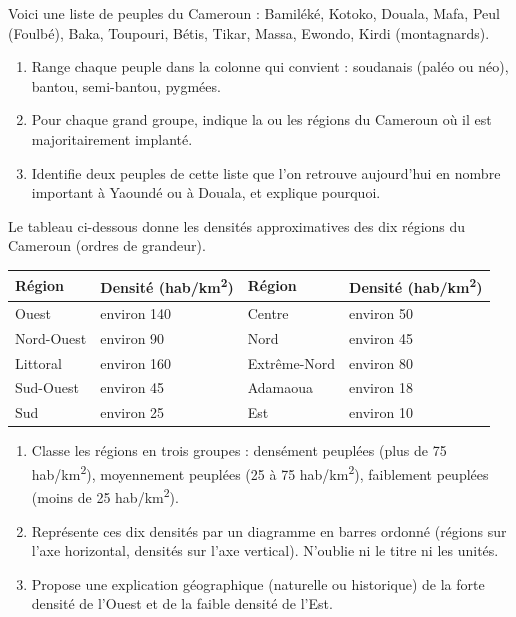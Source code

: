 \documentclass[11pt]{article}
\begin{document}
\begin{exercice}
Voici une liste de peuples du Cameroun : Bamiléké, Kotoko, Douala, Mafa, Peul (Foulbé), Baka, Toupouri, Bétis, Tikar, Massa, Ewondo, Kirdi (montagnards).
\begin{enumerate}
\item Range chaque peuple dans la colonne qui convient : soudanais (paléo ou néo), bantou, semi-bantou, pygmées.
\item Pour chaque grand groupe, indique la ou les régions du Cameroun où il est majoritairement implanté.
\item Identifie deux peuples de cette liste que l'on retrouve aujourd'hui en nombre important à Yaoundé ou à Douala, et explique pourquoi.
\end{enumerate}
\end{exercice}

\begin{exercice}
Le tableau ci-dessous donne les densités approximatives des dix régions du Cameroun (ordres de grandeur).

\begin{center}
\begin{tabularx}{\linewidth}{|l|X|l|X|}
\hline
\rowcolor{popblueL} Région & Densité (hab/km\textsuperscript{2}) & Région & Densité (hab/km\textsuperscript{2}) \\
\hline
Ouest & environ 140 & Centre & environ 50 \\
\hline
Nord-Ouest & environ 90 & Nord & environ 45 \\
\hline
Littoral & environ 160 & Extrême-Nord & environ 80 \\
\hline
Sud-Ouest & environ 45 & Adamaoua & environ 18 \\
\hline
Sud & environ 25 & Est & environ 10 \\
\hline
\end{tabularx}
\end{center}

\begin{enumerate}
\item Classe les régions en trois groupes : densément peuplées (plus de 75 hab/km\textsuperscript{2}), moyennement peuplées (25 à 75 hab/km\textsuperscript{2}), faiblement peuplées (moins de 25 hab/km\textsuperscript{2}).
\item Représente ces dix densités par un diagramme en barres ordonné (régions sur l'axe horizontal, densités sur l'axe vertical). N'oublie ni le titre ni les unités.
\item Propose une explication géographique (naturelle ou historique) de la forte densité de l'Ouest et de la faible densité de l'Est.
\end{enumerate}
\end{exercice}
\end{document}

